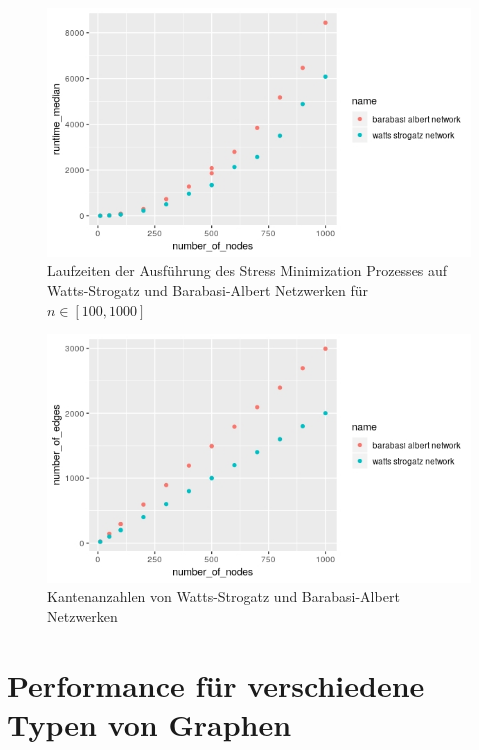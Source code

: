 \documentclass[]{article}
\begin{document}
\begin{figure}
    \centering
	\includegraphics[width=1\textwidth]{watts-strogatz-barabasi-albert-comparison-runtime.jpeg}
    \caption{Laufzeiten der Ausführung des Stress Minimization Prozesses auf Watts-Strogatz und Barabasi-Albert Netzwerken für $n \in [100, 1000]$}
    \label{fig:watts-strogatz-barabasi-albert-runtime}
\end{figure}

\begin{figure}
    \centering
	\includegraphics[width=1\textwidth]{watts-strogatz-barabasi-albert-comparison-nodes-to-edges.jpeg}
    \caption{Kantenanzahlen von Watts-Strogatz und Barabasi-Albert Netzwerken}
    \label{fig:watts-strogatz-barabasi-albert-edges}
\end{figure}

\section{Performance für verschiedene Typen von Graphen}
\end{document}
